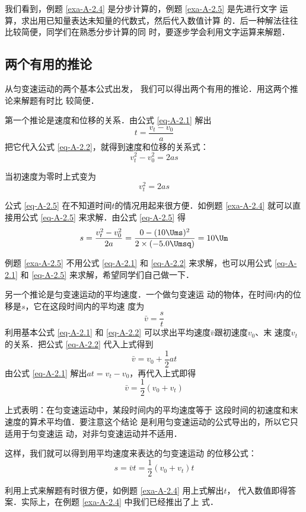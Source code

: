   我们看到，例题 \ref{exa-A-2.4} 是分步计算的，例题 \ref{exa-A-2.5} 是先进行文字
运算，求出用已知量表达未知量的代数式，然后代入数值计算
的．后一种解法往往比较简便，同学们在熟悉分步计算的同
时，要逐步学会利用文字运算来解题．

    \subsection{两个有用的推论}

从匀变速运动的两个基本公式出发，
我们可以得出两个有用的推论．用这两个推论来解题有时比
较简便．

第一个推论是速度和位移的关系．由公式 \eqref{eq-A-2.1} 解出
\[t=\frac{v_t-v_0}{a} \]
把它代入公式 \eqref{eq-A-2.2}，就得到速度和位移的关系式：
\begin{equation}\label{eq-A-2.5}
v^2_t-v^2_0=2as
\end{equation}

当初速度为零时上式变为
\begin{equation}\label{eq-A-2.6}
v^2_t=2as
\end{equation}

    公式 \eqref{eq-A-2.5} 在不知道时间$t$的情况用起来很方便．如例题 \ref{exa-A-2.4} 就可以直接用公式 \eqref{eq-A-2.5} 来求解．由公式 \eqref{eq-A-2.5} 得
\[s=\frac{v^2_t-v^2_0}{2a}=\frac{0-(10\Ums)^2}{2\times (-5.0\Umsq)}=10 \Um\]

    例题 \ref{exa-A-2.5} 不用公式 \eqref{eq-A-2.1} 和 \eqref{eq-A-2.2} 来求解，也可以用公式 \eqref{eq-A-2.1} 和 \eqref{eq-A-2.5} 来求解，希望同学们自己做一下．

    另一个推论是匀变速运动的平均速度．一个做匀变速运
动的物体，在时间$t$内的位移是$s$，它在这段时间内的平均速
度为
\[\bar v=\frac{s}{t} \]
利用基本公式 \eqref{eq-A-2.1} 和 \eqref{eq-A-2.2} 可以求出平均速度$\bar v$跟初速度$v_0$、末
速度$v_t$的关系．把公式 \eqref{eq-A-2.2} 代入上式得到
\[\bar v=v_0+\frac{1}{2}at \]
由公式 \eqref{eq-A-2.1} 解出$at=v_t-v_0$，再代入上式即得
\begin{equation}
\bar v=\frac{1}{2}(v_0+v_t)
\end{equation}

    上式表明：在匀变速运动中，某段时间内的平均速度等于
这段时间的初速度和末速度的算术平均值．要注意这个结论
是利用匀变速运动的公式导出的，所以它只适用于匀变速运
动，对非匀变速运动并不适用．

    这样，我们就可以得到用平均速度来表达的匀变速运动
的位移公式：
\[s=\bar v t=\frac{1}{2} (v_0+v_t)t\]

利用上式来解题有时很方便，如例题 \ref{exa-A-2.4} 用上式解出$t$，
代入数值即得答案．实际上，在例题 \ref{exa-A-2.4} 中我们已经推出了上
式．

